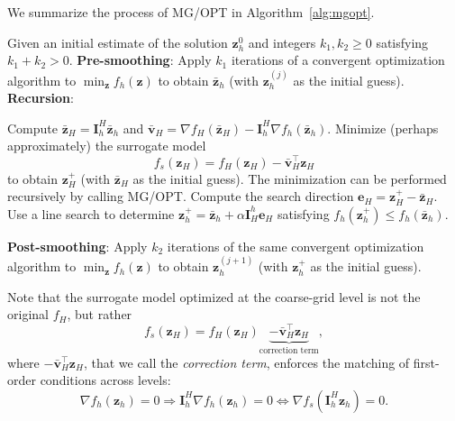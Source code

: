 \documentclass{article}
\numberwithin{equation}{section}
\begin{document}
We summarize the process of MG/OPT in Algorithm~\ref{alg:mgopt}.

\begin{algorithm}[H]
\caption{\texttt{MG/OPT}}
\label{alg:mgopt}
\begin{algorithmic}[1]
\REQUIRE Given an initial estimate of the solution $\bm{z}_h^0$ and integers $k_1, k_2 \ge 0$ satisfying $k_1 + k_2 > 0$.
    \STATE \textbf{Pre-smoothing}: Apply $k_1$ iterations of a convergent optimization algorithm to $\min_{\bm{z}} f_h(\bm{z})$ to obtain $\bar{\bm{z}}_h$ (with $\bm{z}_h^{(j)}$ as the initial guess).
    \STATE \textbf{Recursion}:
    \begin{ALC@g}
        \STATE Compute $\bar{\bm{z}}_H = \bm{I}_h^H \bar{\bm{z}}_h$ and $\bar{\bm{v}}_H = \nabla f_H(\bar{\bm{z}}_H) - \bm{I}_h^H \nabla f_h(\bar{\bm{z}}_h)$.
        \STATE Minimize (perhaps approximately) the surrogate model
        \begin{equation*}
            f_s(\bm{z}_H) = f_H(\bm{z}_H) - \bar{\bm{v}}_H^\top \bm{z}_H
        \end{equation*}
        to obtain $\bm{z}_H^+$ (with $\bar{\bm{z}}_H$ as the initial guess). The minimization can be performed recursively by calling MG/OPT.
        \STATE Compute the search direction $\bm{e}_H = \bm{z}_H^+ - \bar{\bm{z}}_H$.
        \STATE Use a line search to determine $\bm{z}_h^+ = \bar{\bm{z}}_h + \alpha \bm{I}_H^h \bm{e}_H$ satisfying $f_h(\bm{z}_h^+) \le f_h(\bar{\bm{z}}_h)$.
    \end{ALC@g}
    \STATE \textbf{Post-smoothing}: Apply $k_2$ iterations of the same convergent optimization algorithm to $\min_{\bm{z}} f_h(\bm{z})$ to obtain $\bm{z}_h^{{(j+1)}}$ (with $\bm{z}_h^+$ as the initial guess).
\ENDFOR
\end{algorithmic}
\end{algorithm}


Note that the surrogate model optimized at the coarse-grid level is not the original $f_H$, but rather
\begin{equation*}
    f_s(\bm{z}_H) = f_H(\bm{z}_H)\underbrace{-\bar{\bm{v}}_H^\top\bm{z}_H}_{\text{correction term}},
\end{equation*}
where $-\bar{\bm{v}}_H^\top\bm{z}_H$, that we call the \emph{correction term}, enforces the matching of first-order conditions across levels:
\begin{equation*}
\nabla f_h(\bm{z}_h) = 0
\Longrightarrow
\bm{I}_h^H\nabla f_h(\bm{z}_h) = 0
\Longleftrightarrow
\nabla f_s\left(\bm{I}_h^H\bm{z}_h\right) = 0.
\end{equation*}
\end{document}
